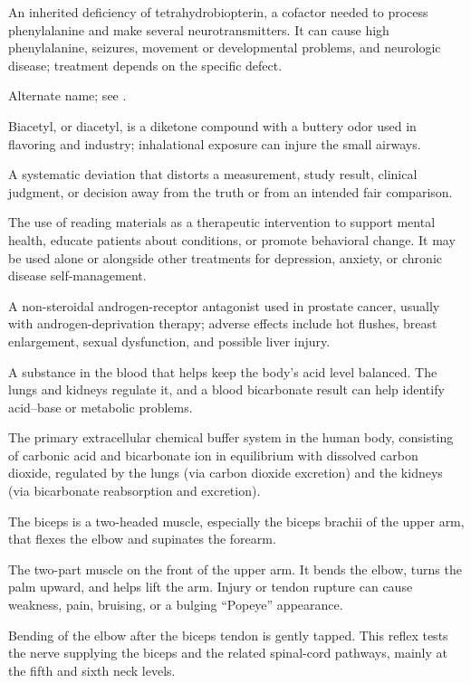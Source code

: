  An inherited deficiency of tetrahydrobiopterin, a cofactor needed to process phenylalanine and make several neurotransmitters. It can cause high phenylalanine, seizures, movement or developmental problems, and neurologic disease; treatment depends on the specific defect.

 Alternate name; see .

 Biacetyl, or diacetyl, is a diketone compound with a buttery odor used in flavoring and industry; inhalational exposure can injure the small airways.

 A systematic deviation that distorts a measurement, study result, clinical judgment, or decision away from the truth or from an intended fair comparison.

 The use of reading materials as a therapeutic intervention to support mental health, educate patients about conditions, or promote behavioral change. It may be used alone or alongside other treatments for depression, anxiety, or chronic disease self-management.

 A non-steroidal androgen-receptor antagonist used in prostate cancer, usually with androgen-deprivation therapy; adverse effects include hot flushes, breast enlargement, sexual dysfunction, and possible liver injury.

 A substance in the blood that helps keep the body’s acid level balanced. The lungs and kidneys regulate it, and a blood bicarbonate result can help identify acid–base or metabolic problems.

 The primary extracellular chemical buffer system in the human body, consisting of carbonic acid and bicarbonate ion in equilibrium with dissolved carbon dioxide, regulated by the lungs (via carbon dioxide excretion) and the kidneys (via bicarbonate reabsorption and excretion).

 The biceps is a two-headed muscle, especially the biceps brachii of the upper arm, that flexes the elbow and supinates the forearm.

 The two-part muscle on the front of the upper arm. It bends the elbow, turns the palm upward, and helps lift the arm. Injury or tendon rupture can cause weakness, pain, bruising, or a bulging “Popeye” appearance.

 Bending of the elbow after the biceps tendon is gently tapped. This reflex tests the nerve supplying the biceps and the related spinal-cord pathways, mainly at the fifth and sixth neck levels.

